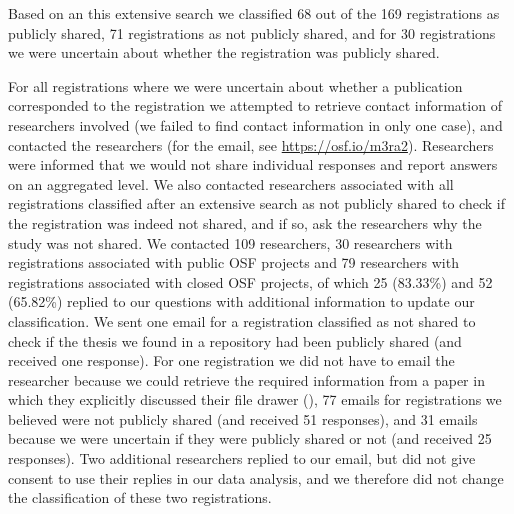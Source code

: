 \documentclass[
  ,man, a4paper,floatsintext]{apa6}
\begin{document}
Based on an this extensive search we classified 68 out of the 169 registrations as publicly shared, 71 registrations as not publicly shared, and for 30 registrations we were uncertain about whether the registration was publicly shared.

For all registrations where we were uncertain about whether a publication corresponded to the registration we attempted to retrieve contact information of researchers involved (we failed to find contact information in only one case), and contacted the researchers (for the email, see \url{https://osf.io/m3ra2}). Researchers were informed that we would not share individual responses and report answers on an aggregated level. We also contacted researchers associated with all registrations classified after an extensive search as not publicly shared to check if the registration was indeed not shared, and if so, ask the researchers why the study was not shared. We contacted 109 researchers, 30 researchers with registrations associated with public OSF projects and 79 researchers with registrations associated with closed OSF projects, of which 25 (83.33\%) and 52 (65.82\%) replied to our questions with additional information to update our classification. We sent one email for a registration classified as not shared to check if the thesis we found in a repository had been publicly shared (and received one response). For one registration we did not have to email the researcher because we could retrieve the required information from a paper in which they explicitly discussed their file drawer (), 77 emails for registrations we believed were not publicly shared (and received 51 responses), and 31 emails because we were uncertain if they were publicly shared or not (and received 25 responses). Two additional researchers replied to our email, but did not give consent to use their replies in our data analysis, and we therefore did not change the classification of these two registrations.
\end{document}
